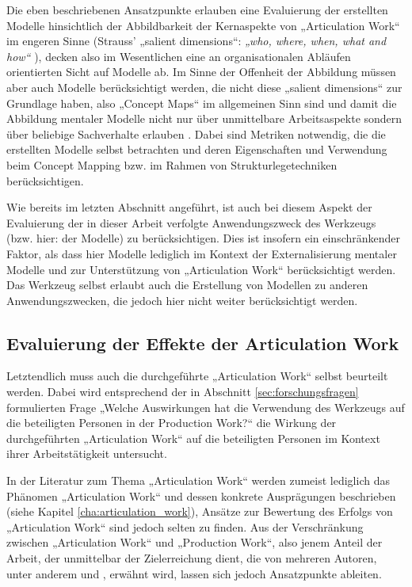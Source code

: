 Die eben beschriebenen Ansatzpunkte erlauben eine Evaluierung der erstellten Modelle hinsichtlich der Abbildbarkeit der Kernaspekte von „Articulation Work“ im engeren Sinne (Strauss' „salient dimensions“: \emph{„who, where, when, what and how“} \citep{Fjuk97}), decken also im Wesentlichen eine an organisationalen Abläufen orientierten Sicht auf Modelle ab. Im Sinne der Offenheit der Abbildung müssen aber auch Modelle berücksichtigt werden, die nicht diese „salient dimensions“ zur Grundlage haben, also „Concept Maps“ \citep{Novak06} im allgemeinen Sinn sind und damit die Abbildung mentaler Modelle nicht nur über unmittelbare Arbeitsaspekte sondern über beliebige Sachverhalte erlauben \citep{Ifenthaler06}. Dabei sind Metriken notwendig, die die erstellten Modelle selbst betrachten und deren Eigenschaften und Verwendung beim Concept Mapping bzw. im Rahmen von Strukturlegetechniken berücksichtigen.

Wie bereits im letzten Abschnitt angeführt, ist auch bei diesem Aspekt der Evaluierung der in dieser Arbeit verfolgte Anwendungszweck des Werkzeugs (bzw. hier: der Modelle) zu berücksichtigen. Dies ist insofern ein einschränkender Faktor, als dass hier Modelle lediglich im Kontext der Externalisierung mentaler Modelle und zur Unterstützung von „Articulation Work“ berücksichtigt werden. Das Werkzeug selbst erlaubt auch die Erstellung von Modellen zu anderen Anwendungszwecken, die jedoch hier nicht weiter berücksichtigt werden.  

\subsection{Evaluierung der Effekte der Articulation Work}
\label{sub:eval_articulation_work}

Letztendlich muss auch die durchgeführte „Articulation Work“ selbst beurteilt werden. Dabei wird entsprechend der in Abschnitt \ref{sec:forschungsfragen} formulierten Frage „Welche Auswirkungen hat die Verwendung des Werkzeugs auf die beteiligten Personen in der Production Work?“ die Wirkung der durchgeführten „Articulation Work“ auf die beteiligten Personen im Kontext ihrer Arbeitstätigkeit untersucht.

In der Literatur zum Thema „Articulation Work“ werden zumeist lediglich das Phänomen „Articulation Work“ und dessen konkrete Ausprägungen beschrieben (siehe Kapitel \ref{cha:articulation_work}), Ansätze zur Bewertung des Erfolgs von „Articulation Work“ sind jedoch selten zu finden. Aus der Verschränkung zwischen „Articulation Work“ und „Production Work“, also jenem Anteil der Arbeit, der unmittelbar der Zielerreichung dient, die von mehreren Autoren, unter anderem \citet{Fujimura87} und \citet{Strauss93}, erwähnt wird, lassen sich jedoch Ansatzpunkte ableiten.

